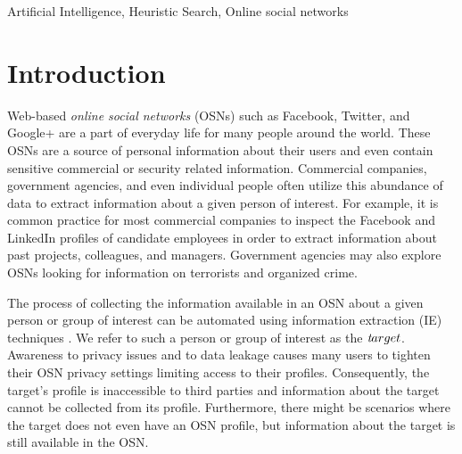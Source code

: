 \documentclass[journal]{IEEEtran}
\newcommand{\target}{{\textit target}}
\begin{document}
\begin{IEEEkeywords}
Artificial Intelligence, Heuristic Search, Online social networks
\end{IEEEkeywords}






%
\IEEEpeerreviewmaketitle



\section{Introduction}

Web-based {\em online social networks} (OSNs) such as Facebook, Twitter, and Google+ are a part of everyday life for many people around the world. These OSNs are a source of personal information about their users and even contain sensitive commercial or security related information. Commercial companies, government agencies, and even individual people often utilize this abundance of data to extract information about a given person of interest. 
For example, it is common practice for most commercial companies to inspect the Facebook and LinkedIn profiles of candidate employees in order to extract information about past projects, colleagues, and managers. Government agencies may also explore OSNs looking for information on terrorists and organized crime. 

The process of collecting the information available in an OSN 
about a given person or group of interest can be automated using information extraction (IE) techniques \cite{chang2006survey}. 
We refer to such a person or group of interest as the $\target$. 
Awareness to privacy issues and to data leakage causes many users to tighten their OSN privacy settings limiting access to their profiles. 
Consequently, the target's profile is inaccessible to third parties and information about the target cannot be collected from its profile. Furthermore, there might be scenarios where the target does not even have an OSN profile, but information about the target is still available in the OSN.
\end{document}
